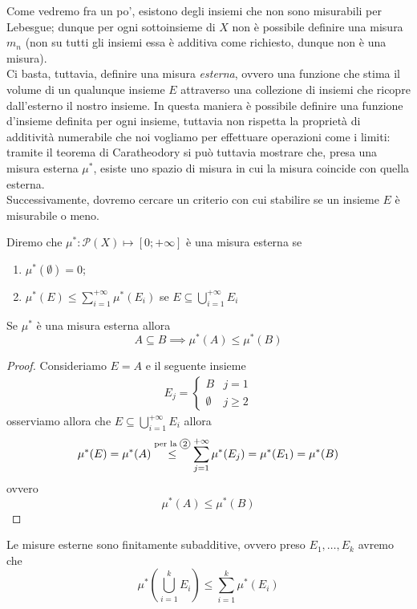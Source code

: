 Come vedremo fra un po', esistono degli insiemi che non sono misurabili per Lebesgue; dunque per ogni sottoinsieme di $X$ non è possibile definire una misura $m_n$ (non su tutti gli insiemi essa è additiva come richiesto, dunque non è una misura). \\ Ci basta, tuttavia, definire una misura \emph{esterna}, ovvero
una funzione che stima il volume di un qualunque insieme $E$ attraverso una collezione di insiemi che ricopre dall'esterno il nostro insieme. In questa maniera è possibile definire una funzione d'insieme definita per ogni insieme, tuttavia non rispetta la proprietà di additività numerabile che noi vogliamo per effettuare operazioni come i limiti: tramite 
il teorema di Caratheodory si può tuttavia mostrare che, presa una misura esterna $\mu^*$, esiste uno spazio di misura in cui la misura coincide con quella esterna. \\
Successivamente, dovremo cercare un criterio con cui stabilire se un insieme $E$ è misurabile o meno.
\begin{definition}
	Diremo che $\mu^*: \mathcal{P}(X) \mapsto [0; +\infty]$ è una misura esterna se
	\begin{enumerate}[label=\protect\circled{\arabic*}]
		\item $\mu^*(\emptyset) = 0$;
		\item $\mu^*(E) \leq \sum\limits_{i=1}^{+\infty} \mu^*(E_i)$ se $E \subseteq \bigcup\limits_{i=1}^{+\infty} E_i$
	\end{enumerate}
\end{definition}
\begin{prop}
	Se $\mu^*$ è una misura esterna allora
	$$
	A \subseteq B \implies \mu^*(A) \leq \mu^*(B)
	$$
	\label{prop:monotonia}
\end{prop}
\begin{proof}
	Consideriamo $E = A$ e il seguente insieme
	\begin{align*}
	E_j = \begin{cases} B & j=1 \\ \emptyset & j \geq 2	\end{cases}
	\end{align*}
	osserviamo allora che $E \subseteq \bigcup\limits_{i=1}^{+\infty} E_i$ allora
	$$
	\mu^*(E) = \mu^*(A) \stackrel{\text{per la \circled{2}}}{\leq} \sum_{j=1}^{+\infty} \mu^*(E_j) = \mu^*(E_1) = \mu^*(B)
	$$
	ovvero
	$$
	\mu^*(A) \leq \mu^*(B)
	$$
\end{proof}
\begin{prop}
	Le misure esterne sono finitamente subadditive, ovvero preso $E_1, \ldots, E_k$ avremo che 
	$$
	\mu^* \left( \bigcup_{i=1}^{k} E_i \right) \leq \sum_{i=1}^k \mu^*(E_i)
	$$
	\label{prop:sub_finita}
\end{prop}
